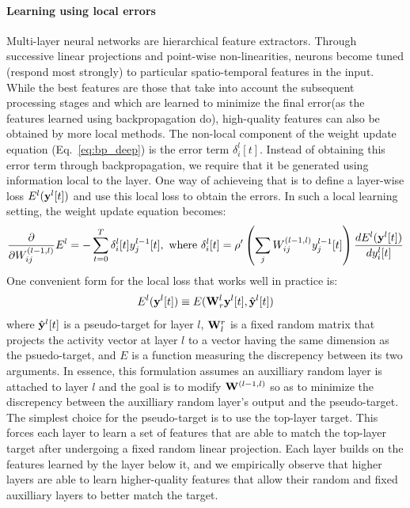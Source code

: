 \documentclass[journal,onecolumn,11pt]{IEEEtran}
\begin{document}
\paragraph{Learning using local errors} Multi-layer neural networks are hierarchical feature extractors. Through successive linear projections and point-wise non-linearities, neurons become tuned (respond most strongly) to particular spatio-temporal features in the input. While the best features are those that take into account the subsequent processing stages and which are learned to minimize the final error(as the features learned using backpropagation do), high-quality features can also be obtained by more local methods. The non-local component of the weight update equation (Eq.~\ref{eq:bp_deep}) is the error term $\delta_i^l[t]$. Instead of obtaining this error term through backpropagation, we require that it be generated using information local to the layer. One way of achieveing that is to define a layer-wise loss $E^l({\bf y}^l[t])$ and use this local loss to obtain the errors. In such a local learning setting, the weight update equation becomes:
\begin{equation}\label{eq:bp_local}
  \frac{\mathrm{\partial}}{\mathrm{\partial} W^{(l-1,l)}_{ij}} E^l = -\sum_{t=0}^T \delta_{i}^{l}[t]  y^{l-1}_j[t],
    \text{ where }
    \delta_{i}^{l} [t] = \rho'\left(\sum_j W^{(l-1,l)}_{ij} y^{l-1}_j [t] \right) \frac{dE^l({\bf y}^l[t])}{dy_i^l[t]}
\end{equation}
One convenient form for the local loss that works well in practice is:
\begin{equation}
E^l({\bf y}^l[t]) \equiv E({\bf W}^l_{r} {\bf y}^l[t],\hat{{\bf y}}^{l}[t])
\end{equation}
where $\hat{{\bf y}}^{l}[t]$ is a pseudo-target for layer $l$, ${\bf W}_l^{r}$ is a fixed random matrix that projects the activity vector at layer $l$ to a vector having the same dimension as the psuedo-target, and $E$ is a function measuring the discrepency between its two arguments. In essence, this formulation assumes an auxilliary random layer is attached to layer $l$ and the goal is to modify ${\bf W}^{(l-1,l)}$ so as to minimize the discrepency between the auxilliary random layer's output and the pseudo-target. The simplest choice for the pseudo-target is to use the top-layer target. This forces each layer to learn a set of features that are able to match the top-layer target after undergoing a fixed random linear projection. Each layer builds on the features learned by the layer below it, and we empirically observe that higher layers are able to learn higher-quality features that allow their random and fixed auxilliary layers to better match the target.
\end{document}
